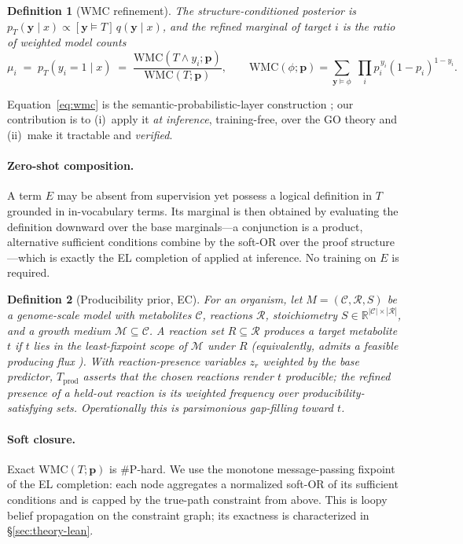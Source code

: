 \documentclass[11pt]{article}
\newtheorem{definition}{Definition}
\newcommand{\WMC}{\mathrm{WMC}}
\newcommand{\R}{\mathbb{R}}
\newcommand{\bC}[1]{\boldsymbol{#1}}
\begin{document}
\begin{definition}[WMC refinement]
The structure-conditioned posterior is $p_T(\bC y\mid x)\propto[\bC y\models T]\,q(\bC y\mid x)$,
and the refined marginal of target $i$ is the ratio of weighted model counts
\begin{equation}\label{eq:wmc}
\mu_i \;=\; p_T(y_i{=}1\mid x)\;=\;\frac{\WMC(T\wedge y_i;\bC p)}{\WMC(T;\bC p)},\qquad
\WMC(\phi;\bC p)=\!\!\sum_{\bC y\models\phi}\;\prod_i p_i^{\,y_i}(1-p_i)^{1-y_i}.
\end{equation}
\end{definition}
Equation~\eqref{eq:wmc} is the semantic-probabilistic-layer construction
\citep{ahmed2022spl,xu2018semanticloss}; our contribution is to (i)~apply it \emph{at inference},
training-free, over the GO theory and (ii)~make it tractable and \emph{verified}.

\paragraph{Zero-shot composition.}
A term $E$ may be absent from supervision yet possess a logical definition in $T$ grounded in
in-vocabulary terms. Its marginal is then obtained by evaluating the definition downward over the
base marginals---a conjunction is a product, alternative sufficient conditions combine by the
soft-OR over the proof structure---which is exactly the EL completion of \citet{kazakov2014elk}
applied at inference. No training on $E$ is required.

\begin{definition}[Producibility prior, EC]\label{def:prod}
For an organism, let $M=(\mathcal{C},\mathcal{R},S)$ be a genome-scale model with metabolites
$\mathcal C$, reactions $\mathcal R$, stoichiometry $S\in\R^{|\mathcal C|\times|\mathcal R|}$, and a
growth medium $\mathcal M\subseteq\mathcal C$. A reaction set $R\subseteq\mathcal R$ \emph{produces}
a target metabolite $t$ if $t$ lies in the least-fixpoint scope of $\mathcal M$ under $R$
\citep{ebenhoeh2004scope} (equivalently, admits a feasible producing flux \citep{orth2010fba}).
With reaction-presence variables $z_r$ weighted by the base predictor, $T_{\text{prod}}$ asserts
that the chosen reactions render $t$ producible; the refined presence of a held-out reaction is
its weighted frequency over producibility-satisfying sets. Operationally this is parsimonious
gap-filling toward $t$.
\end{definition}

\paragraph{Soft closure.}
Exact $\WMC(T;\bC p)$ is $\#$P-hard. We use the monotone message-passing fixpoint of the EL
completion: each node aggregates a normalized soft-OR of its sufficient conditions and is capped
by the true-path constraint from above. This is loopy belief propagation on the constraint graph;
its exactness is characterized in \S\ref{sec:theory-lean}.
\end{document}
